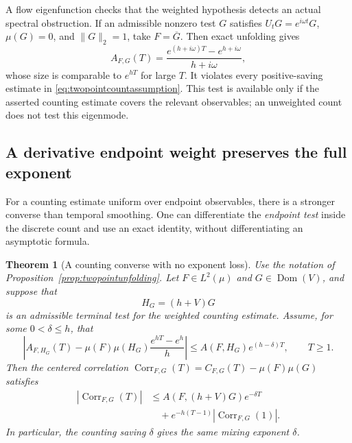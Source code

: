 \documentclass[11pt,a4paper]{article}
\numberwithin{equation}{section}
\newtheorem{theorem}{Theorem}[section]
\theoremstyle{definition}
\theoremstyle{remark}
\begin{document}
A flow eigenfunction checks that the weighted hypothesis detects an
actual spectral obstruction. If an admissible nonzero test $G$ satisfies
$U_tG=e^{i\omega t}G$, $\mu(G)=0$, and $\|G\|_2=1$, take
$F=\overline G$. Then exact unfolding gives
\[
 A_{F,G}(T)
 =\frac{e^{(h+i\omega)T}-e^{h+i\omega}}{h+i\omega},
\]
whose size is comparable to $e^{hT}$ for large $T$. It violates
every positive-saving estimate in
\eqref{eq:twopointcountassumption}. This test is available only if
the asserted counting estimate covers the relevant observables;
an unweighted count does not test this eigenmode.

\subsection{A derivative endpoint weight preserves the full exponent}
\label{subsec:twopointderivativeweight}

For a counting estimate uniform over endpoint observables, there is
a stronger converse than temporal smoothing. One can differentiate
the \emph{endpoint test} inside the discrete count and use an exact
identity, without differentiating an asymptotic formula.

\begin{theorem}[A counting converse with no exponent loss]
\label{thm:twopointfullrate}
Use the notation of Proposition~\ref{prop:twopointunfolding}. Let
$F\in L^2(\mu)$ and $G\in\operatorname{Dom}(V)$, and suppose that
\[
 H_G=(h+V)G
\]
is an admissible terminal test for the weighted counting estimate.
Assume, for some $0<\delta\leq h$, that
\begin{equation}
 \left| A_{F,H_G}(T)
       -\mu(F)\mu(H_G)\frac{e^{hT}-e^h}{h}\right|
 \leq A(F,H_G)e^{(h-\delta)T},\qquad T\geq1.
 \label{eq:twopointderivativecount}
\end{equation}
Then the centered correlation
$\operatorname{Corr}_{F,G}(T)=C_{F,G}(T)-\mu(F)\mu(G)$ satisfies
\begin{equation}
 \begin{split}
 |\operatorname{Corr}_{F,G}(T)|
 &\leq A(F,(h+V)G)e^{-\delta T}\\
 &\quad+e^{-h(T-1)}
       |\operatorname{Corr}_{F,G}(1)|.
 \end{split}
 \label{eq:twopointfullrate}
\end{equation}
In particular, the counting saving $\delta$ gives the same
mixing exponent $\delta$.
\end{theorem}
\end{document}
